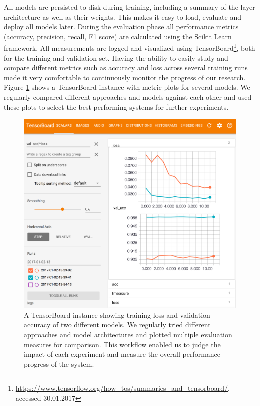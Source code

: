 	All models are persisted to disk during training, including a summary of the layer architecture as well as their weights. This makes it easy to load, evaluate and deploy all models later. During the evaluation phase all performance metrics (accuracy, precision, recall, F1 score) are calculated using the Scikit Learn\cite{scikit-learn} framework. All measurements are logged and visualized using TensorBoard\footnote{\url{https://www.tensorflow.org/how_tos/summaries_and_tensorboard/}, accessed 30.01.2017}, both for the training and validation set. Having the ability to easily study and compare different metrics such as accuracy and loss across several training runs made it very comfortable to continuously monitor the progress of our research. Figure \ref{fig:tensorboard} shows a TensorBoard instance with metric plots for several models. We regularly compared different approaches and models against each other and used these plots to select the best performing systems for further experiments.
	\begin{figure}[]
  		\centering
    	\includegraphics[width=\textwidth,keepaspectratio]{img/tensorboard2.png}
    	\caption{A TensorBoard instance showing training loss and validation accuracy of two different models. We regularly tried different approaches and model architectures and plotted multiple evaluation measures for comparison. This workflow enabled us to judge the impact of each experiment and measure the overall performance progress of the system.}
    	\label{fig:tensorboard}
	\end{figure}		

